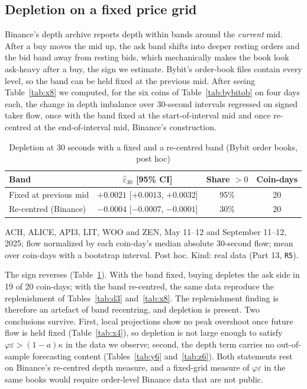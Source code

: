 \subsection{Depletion on a fixed price grid}\label{sec:fixedgrid}
Binance's depth archive reports depth within bands around the \emph{current} mid. After a buy moves the mid up, the ask band shifts into deeper resting orders and the bid band away from resting bids, which mechanically makes the book look ask-heavy after a buy, the sign we estimate. Bybit's order-book files contain every level, so the band can be held fixed at the previous mid. After seeing Table~\ref{tab:x8} we computed, for the six coins of Table~\ref{tab:bybitob} on four days each, the change in depth imbalance over 30-second intervals regressed on signed taker flow, once with the band fixed at the start-of-interval mid and once re-centred at the end-of-interval mid, Binance's construction.

\begin{table}[t]\centering\small
\begin{threeparttable}
\caption{Depletion at 30 seconds with a fixed and a re-centred band (Bybit order books, post hoc)}\label{tab:fixedgrid}
\begin{tabular}{lccc}
\toprule
Band & $\hat\varepsilon_{30}$ [95\% CI] & Share $>0$ & Coin-days\\
\midrule
Fixed at previous mid & $+0.0021$ [$+0.0013$, $+0.0032$] & 95\% & 20\\
Re-centred (Binance) & $-0.0004$ [$-0.0007$, $-0.0001$] & 30\% & 20\\
\bottomrule
\end{tabular}
\begin{tablenotes}\footnotesize\item ACH, ALICE, API3, LIT, WOO and ZEN, May 11--12 and September 11--12, 2025; flow normalized by each coin-day's median absolute 30-second flow; mean over coin-days with a bootstrap interval. Post hoc. Kind: real data (Part 13, \texttt{R5}).\end{tablenotes}
\end{threeparttable}
\end{table}

The sign reverses (Table~\ref{tab:fixedgrid}). With the band fixed, buying depletes the ask side in 19 of 20 coin-days; with the band re-centred, the same data reproduce the replenishment of Tables~\ref{tab:d3} and~\ref{tab:x8}. The replenishment finding is therefore an artefact of band recentring, and depletion is present. Two conclusions survive. First, local projections show no peak overshoot once future flow is held fixed (Table~\ref{tab:x4}), so depletion is not large enough to satisfy $\varphi\varepsilon>(1-a)\kappa$ in the data we observe; second, the depth term carries no out-of-sample forecasting content (Tables~\ref{tab:y6} and~\ref{tab:z6}). Both statements rest on Binance's re-centred depth measure, and a fixed-grid measure of $\varphi\varepsilon$ in the same books would require order-level Binance data that are not public.


